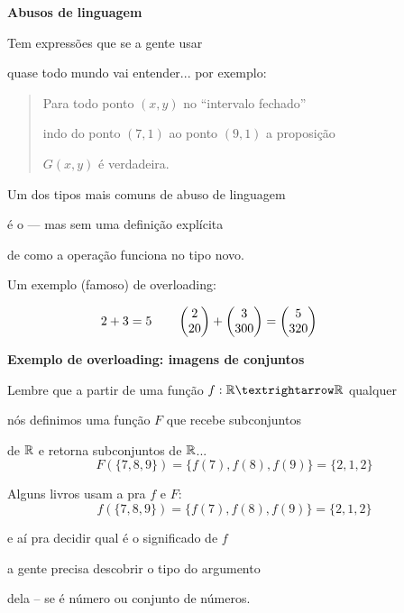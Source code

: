 \documentclass[oneside,12pt]{article}
\begin{document}
\newpage


{\bf Abusos de linguagem}

Tem expressões que se a gente usar 

quase todo mundo vai entender... por exemplo:

\begin{quotation}

  Para todo ponto $(x,y)$ no ``intervalo fechado''

  indo do ponto $(7,1)$ ao ponto $(9,1)$ a proposição

  $G(x,y)$ é verdadeira.

\end{quotation}

Um dos tipos mais comuns de abuso de linguagem

é o  --- mas sem uma definição explícita

de como a operação funciona no tipo novo.

Um exemplo (famoso) de overloading:

$$2 + 3 = 5
  \qquad
  \left (\begin{matrix}2 \\ 20\end{matrix}\right ) + \left (\begin{matrix}3 \\ 300\end{matrix}\right ) = \left (\begin{matrix}5 \\ 320\end{matrix}\right )
  \qquad
  \qquad
$$

\newpage


{\bf Exemplo de overloading: imagens de conjuntos}

Lembre que a partir de uma função $f:\R→\R$ qualquer

nós definimos uma função $F$ que recebe subconjuntos

de $\mathbb{R}$ e retorna subconjuntos de $\mathbb{R}$...
%
$$F(\{7,8,9\}) = \{f(7), f(8), f(9)\} = \{2, 1, 2\}$$

Alguns livros usam a  pra $f$ e $F$:
%
$$f(\{7,8,9\}) = \{f(7), f(8), f(9)\} = \{2, 1, 2\}$$

e aí pra decidir qual é o significado de $f$

a gente precisa descobrir o tipo do argumento

dela -- se é número ou conjunto de números. 
\end{document}
